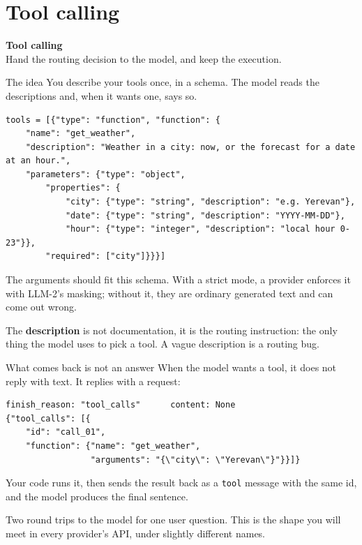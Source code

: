 \documentclass[aspectratio=169]{beamer}
\newcommand{\keybox}[1]{%
  \begin{tcolorbox}[colback=armblue!8, colframe=armblue, boxrule=0.6pt, arc=2pt]
  #1
  \end{tcolorbox}}
\newcommand{\watchbox}[1]{%
  \begin{tcolorbox}[colback=armorange!12, colframe=armorange, boxrule=0.6pt, arc=2pt]
  #1
  \end{tcolorbox}}
\newcommand{\sectiontransition}[2]{%
  \begin{frame}[plain]
    \vfill
    \begin{center}
      {\Huge\bfseries\color{popblue} #1}\\[1.1em]
      {\large #2}
    \end{center}
    \vfill
  \end{frame}}
\begin{document}
\section{Tool calling}
\sectiontransition{Tool calling}{Hand the routing decision to the model, and keep the execution.}

\begin{frame}[fragile]{The idea}
  \vspace{0.25em}
  You describe your tools once, in a schema. The model reads the descriptions and, when it
  wants one, says so.

  \begin{lstlisting}
tools = [{"type": "function", "function": {
    "name": "get_weather",
    "description": "Weather in a city: now, or the forecast for a date at an hour.",
    "parameters": {"type": "object",
        "properties": {
            "city": {"type": "string", "description": "e.g. Yerevan"},
            "date": {"type": "string", "description": "YYYY-MM-DD"},
            "hour": {"type": "integer", "description": "local hour 0-23"}},
        "required": ["city"]}}}]
\end{lstlisting}

  \vspace{0.1em}
  {\footnotesize The arguments should fit this schema. With a strict mode, a provider enforces it with LLM-2's
  masking; without it, they are ordinary generated text and can come out wrong.}

  \vspace{-0.1em}
  \watchbox{\small The \textbf{description} is not documentation, it is the routing instruction: the only thing the
  model uses to pick a tool. A vague description is a routing bug.}
\end{frame}

\begin{frame}[fragile]{What comes back is not an answer}
  \vspace{0.7em}
  When the model wants a tool, it does not reply with text. It replies with a request:

  \begin{lstlisting}
finish_reason: "tool_calls"      content: None
{"tool_calls": [{
    "id": "call_01",
    "function": {"name": "get_weather",
                 "arguments": "{\"city\": \"Yerevan\"}"}}]}
\end{lstlisting}

  \vspace{0.5em}
  Your code runs it, then sends the result back as a \texttt{tool} message with the same id, and
  the model produces the final sentence.

  \vspace{0.7em}
  \keybox{Two round trips to the model for one user question. This is the shape you will meet
  in every provider's API, under slightly different names.}
\end{frame}
\end{document}
